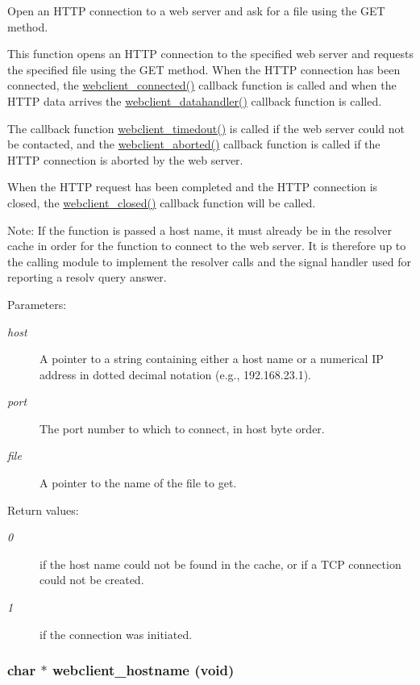 Open an HTTP connection to a web server and ask for a file using the GET method. 

This function opens an HTTP connection to the specified web server and requests the specified file using the GET method. When the HTTP connection has been connected, the \hyperlink{a00079_g6b942c1ef22f8cd1a726ef3364c9fbea}{webclient\_\-connected()} callback function is called and when the HTTP data arrives the \hyperlink{a00079_gc4b119801e50cc1824498a1cdf9adc37}{webclient\_\-datahandler()} callback function is called.

The callback function \hyperlink{a00079_g23705efb9077187881f094fc9be13bde}{webclient\_\-timedout()} is called if the web server could not be contacted, and the \hyperlink{a00079_gf11d9915ec12a8cdd9fdcbb5e8fcd5c7}{webclient\_\-aborted()} callback function is called if the HTTP connection is aborted by the web server.

When the HTTP request has been completed and the HTTP connection is closed, the \hyperlink{a00079_gf8f12c820cc08da32aa62898bfc02db3}{webclient\_\-closed()} callback function will be called.

\begin{Desc}
\item[Note:]If the function is passed a host name, it must already be in the resolver cache in order for the function to connect to the web server. It is therefore up to the calling module to implement the resolver calls and the signal handler used for reporting a resolv query answer.\end{Desc}
\begin{Desc}
\item[Parameters:]
\begin{description}
\item[{\em host}]A pointer to a string containing either a host name or a numerical IP address in dotted decimal notation (e.g., 192.168.23.1).\item[{\em port}]The port number to which to connect, in host byte order.\item[{\em file}]A pointer to the name of the file to get.\end{description}
\end{Desc}
\begin{Desc}
\item[Return values:]
\begin{description}
\item[{\em 0}]if the host name could not be found in the cache, or if a TCP connection could not be created.\item[{\em 1}]if the connection was initiated. \end{description}
\end{Desc}
\hypertarget{a00079_g0e0ea5f24b77f124ba33bcbc7ede5bfb}{
\subsubsection[webclient\_\-hostname]{\setlength{\rightskip}{0pt plus 5cm}char $\ast$ webclient\_\-hostname (void)}}
\label{a00079_g0e0ea5f24b77f124ba33bcbc7ede5bfb}



